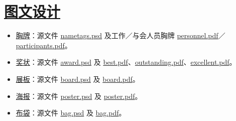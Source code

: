 \documentclass[a4,11pt]{article}
\makeatletter
\def\hlinewd#1{%
\noalign{\ifnum0=`}\fi\hrule \@height #1 %
\futurelet\reserved@a\@xhline}
\makeatother
\begin{document}

\section{\href{run:materials/design/}{图文设计}}
\begin{itemize}
\item \href{run:materials/design/nametags}{胸牌}：源文件 \href{run:materials/design/nametags/nametags.psd}{nametags.psd} 及工作／与会人员胸牌 \href{materials/design/nametags/personnel.pdf}{personnel.pdf}／\href{materials/design/nametags/participants.pdf}{participants.pdf}。
\item \href{run:materials/design/awards}{奖状}：源文件 \href{run:materials/design/awards/award.psd}{award.psd} 及 \href{materials/design/awards/best.pdf}{best.pdf}、\href{materials/design/awards/outstanding.pdf}{outstanding.pdf}、\href{materials/design/awards/excellent.pdf}{excellent.pdf}。
\item \href{run:materials/design/board}{展板}：源文件 \href{run:materials/design/board/board.psd}{board.psd} 及 \href{materials/design/board/board.pdf}{board.pdf}。
\item \href{run:materials/design/board}{海报}：源文件 \href{run:materials/design/poster/poster.psd}{poster.psd} 及 \href{materials/design/poster/poster.pdf}{poster.pdf}。

\item \href{run:materials/design/board}{布袋}：源文件 \href{run:materials/design/bag/bag.psd}{bag.psd} 及 \href{materials/design/bag/bag.pdf}{bag.pdf}。

\end{itemize}
\end{document}
